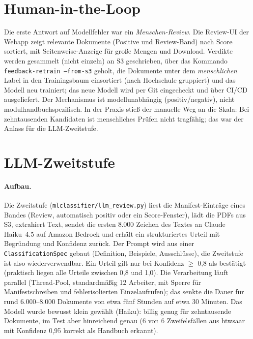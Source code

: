 
\section{Human-in-the-Loop}
Die erste Antwort auf Modellfehler war ein \emph{Menschen-Review}. Die Review-UI der Webapp zeigt relevante Dokumente (Positive und Review-Band) nach Score sortiert, mit Seitenweise-Anzeige für große Mengen und Download. Verdikte werden gesammelt (nicht einzeln) an S3 geschrieben, über das Kommando \texttt{feedback-retrain --from-s3} geholt, die Dokumente unter dem \emph{menschlichen} Label in den Trainingsbaum einsortiert (nach Hochschule gruppiert) und das Modell neu trainiert; das neue Modell wird per Git eingecheckt und über CI/CD ausgeliefert. Der Mechanismus ist modellunabhängig (positiv/negativ), nicht modulhandbuchspezifisch. In der Praxis stieß der manuelle Weg an die Skala: Bei zehntausenden Kandidaten ist menschliches Prüfen nicht tragfähig; das war der Anlass für die LLM-Zweitstufe.

\section{LLM-Zweitstufe}\label{sec:llm}
\paragraph{Aufbau.} Die Zweitstufe (\texttt{mlclassifier/llm\_review.py}) liest die Manifest-Einträge eines Bandes (Review, automatisch positiv oder ein Score-Fenster), lädt die PDFs aus S3, extrahiert Text, sendet die ersten 8.000 Zeichen des Textes an Claude Haiku~4.5 auf Amazon Bedrock und erhält ein strukturiertes Urteil mit Begründung und Konfidenz zurück. Der Prompt wird aus einer \texttt{ClassificationSpec} gebaut (Definition, Beispiele, Ausschlüsse), die Zweitstufe ist also wiederverwendbar. Ein Urteil gilt nur bei Konfidenz $\ge$ 0,8 als bestätigt (praktisch liegen alle Urteile zwischen 0,8 und 1,0). Die Verarbeitung läuft parallel (Thread-Pool, standardmäßig 12 Arbeiter, mit Sperre für Manifestschreiben und fehlerisolierten Einzelaufrufen); das senkte die Dauer für rund 6.000--8.000 Dokumente von etwa fünf Stunden auf etwa 30 Minuten. Das Modell wurde bewusst klein gewählt (Haiku): billig genug für zehntausende Dokumente, im Test aber hinreichend genau (6 von 6 Zweifelsfällen aus htwsaar mit Konfidenz 0,95 korrekt als Handbuch erkannt).


